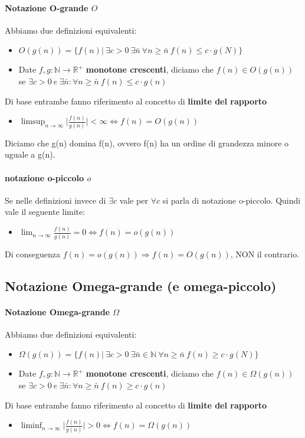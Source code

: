 \documentclass{article}
\begin{document}
\paragraph{Notazione O-grande $O$} Abbiamo due definizioni equivalenti:
\begin{itemize}
\item $O(g(n))=\{f(n)| \ \exists c > 0 \ \exists \bar{n} \ \forall n \geq \bar{n} \ f(n) \leq c \cdot g(N)\}$ 
\item Date $f,g : \mathbb{N} \rightarrow \mathbb{R^+}$ \textbf{monotone crescenti}, diciamo che $f(n) \in O(g(n))$ se $\exists c > 0 \ e \ \exists \bar{n} : \forall n \geq \bar{n} \ f(n) \leq c \cdot g(n)$
\end{itemize}
Di base entrambe fanno riferimento al concetto di \textbf{limite del rapporto} 
\begin{itemize}
    \item $\displaystyle \limsup_{n \to \infty} \lvert \frac{f(n)}{g(n)} \rvert < \infty \Leftrightarrow f(n) = O(g(n))$ 
\end{itemize}
Diciamo che g(n) domina f(n), ovvero f(n) ha un ordine di grandezza minore o uguale a g(n).
\paragraph{notazione o-piccolo $o$} Se nelle definizioni invece di $\exists c$ vale per $\forall c$  si parla di notazione o-piccolo. Quindi vale il seguente limite:
\begin{itemize}
    \item $\displaystyle \lim_{n \rightarrow \infty} \frac{f(n)}{g(n)} = 0 \Leftrightarrow f(n) = o(g(n))$
\end{itemize}
Di conseguenza $f(n) = o(g(n)) \Rightarrow f(n) = O(g(n))$, NON il contrario.
\subsection{Notazione Omega-grande (e omega-piccolo)} %
\paragraph{Notazione Omega-grande $\Omega$} Abbiamo due definizioni equivalenti:
\begin{itemize}
\item $\Omega(g(n))=\{f(n)| \ \exists c > 0 \ \exists \bar{n} \in \mathbb{N} \ \forall n \geq \bar{n} \ f(n) \geq c \cdot g(N)\}$ 
\item Date $f,g : \mathbb{N} \rightarrow \mathbb{R^+}$ \textbf{monotone crescenti}, diciamo che $f(n) \in \Omega(g(n))$ se $\exists c > 0 \ e \ \exists \bar{n} : \forall n \geq \bar{n} \ f(n) \geq c \cdot g(n)$
\end{itemize}
Di base entrambe fanno riferimento al concetto di \textbf{limite del rapporto}
\begin{itemize}
    \item $\displaystyle \liminf_{n \rightarrow \infty} \lvert \frac{f(n)}{g(n)} \rvert > 0 \Leftrightarrow f(n) = \Omega(g(n))$
\end{itemize}
\end{document}
